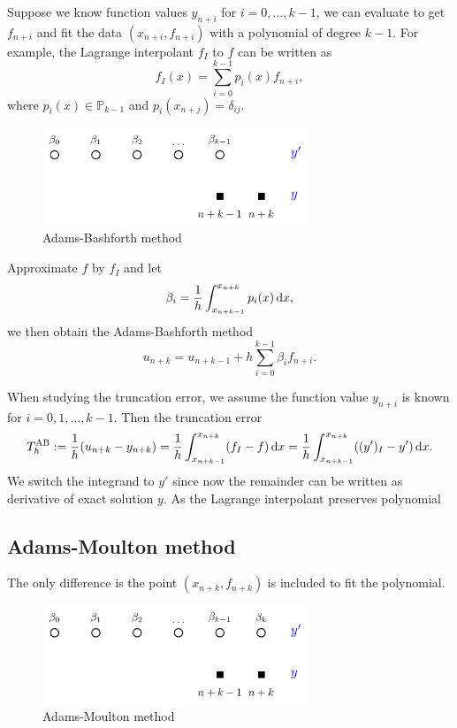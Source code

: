 \documentclass[10pt]{amsart}
\begin{document}
Suppose we know function values $y_{n+i}$ for $i=0,\ldots, k-1$, we can evaluate to get $f_{n+i}$ and fit the data $(x_{n+i}, f_{n+i})$ with a polynomial of degree $k-1$. For example, the Lagrange interpolant $f_I$ to $f$ can be written as 
$$
f_I(x) = \sum_{i=0}^{k-1}p_i(x) f_{n+i},
$$
where $p_i(x)\in \mathbb P_{k-1}$ and $p_i(x_{n+j}) = \delta_{ij}$. 

\begin{figure}[htbp]
\begin{center}
\includegraphics[width=8cm]{figures/ABmethod.pdf}
\caption{Adams-Bashforth method}
\label{fig:multistep}
\end{center}
\end{figure}

Approximate $f$ by $f_I$ and let $$\beta_i = \frac{1}{h}\int_{x_{n+k-1}}^{x_{n+k}} p_i(x) \,{\rm d}x,$$ we then obtain the Adams-Bashforth method
\begin{equation}
u_{n+k} = u_{n+k-1} + h \sum_{i=0}^{k-1}\beta_i f_{n+i}.
\end{equation}

When studying the truncation error, we assume the function value $y_{n+i}$ is known for $i=0,1,\ldots,k-1$. Then the truncation error $$T_h^{\rm AB} := \frac{1}{h} (u_{n+k} - y_{n+k}) = \frac{1}{h} \int_{x_{n+k-1}}^{x_{n+k}} (f_I - f) \,{\rm d}x = \frac{1}{h} \int_{x_{n+k-1}}^{x_{n+k}} ((y')_I - y') \,{\rm d}x.$$
We switch the integrand to $y'$ since now the remainder can be written as derivative of exact solution $y$. As the Lagrange interpolant preserves polynomial  

\subsection{Adams-Moulton method}
The only difference is the point $(x_{n+k}, f_{n+k})$ is included to fit the polynomial. 
\begin{figure}[htbp]
\begin{center}
\includegraphics[width=8cm]{figures/AMmethod.pdf}
\caption{Adams-Moulton method}
\label{fig:multistep}
\end{center}
\end{figure}
\end{document}
